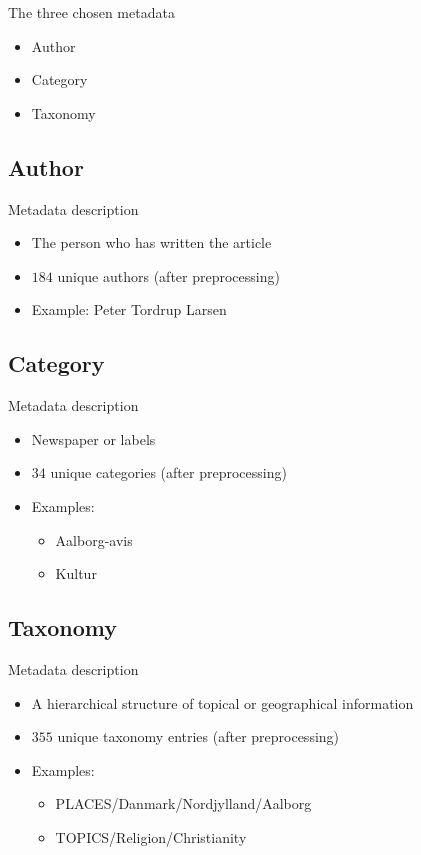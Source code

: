 \begin{frame}{\insertsection}{The three chosen metadata}
	\begin{itemize}
		\item Author
		\item Category
		\item Taxonomy
	\end{itemize}
\end{frame}

\subsection{Author}

\begin{frame}{\insertsubsection}{Metadata description}
	\begin{itemize}
		\item The person who has written the article
		\item $184$ unique authors (after preprocessing)
		\item Example: Peter Tordrup Larsen
	\end{itemize}
\end{frame}


\subsection{Category}

\begin{frame}{\insertsubsection}{Metadata description}
	\begin{itemize}
		\item Newspaper or labels
		\item $34$ unique categories (after preprocessing)
		\item Examples:
		\begin{itemize}
			\item Aalborg-avis
			\item Kultur
		\end{itemize}
	\end{itemize}
\end{frame}


\subsection{Taxonomy}

\begin{frame}{\insertsubsection}{Metadata description}
	\begin{itemize}
		\item A hierarchical structure of topical or geographical information 
		\item $355$ unique taxonomy entries (after preprocessing)
		\item Examples: 
		\begin{itemize}
			\item PLACES/Danmark/Nordjylland/Aalborg
			\item TOPICS/Religion/Christianity
		\end{itemize}
	\end{itemize}
\end{frame}

